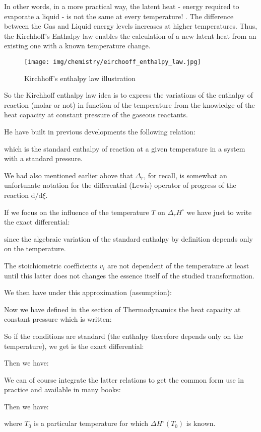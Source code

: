 	In other words, in a more practical way, the latent heat - energy required to evaporate a liquid - is not the same at every temperature! . The difference between the Gas and Liquid energy levels increases at higher temperatures. Thus, the Kirchhoff's Enthalpy law enables the calculation of a new latent heat from an existing one with a known temperature change.
	\begin{figure}[H]
		\centering
		\texttt{[image: img/chemistry/eirchooff\_enthalpy\_law.jpg]}	
		\caption{Kirchhoff's enthalpy law illustration}
	\end{figure}
	So the Kirchhoff enthalpy law idea is to express the variations of the enthalpy of reaction (molar or not) in function of the temperature from the knowledge of the heat capacity at constant pressure of the gaseous reactants.

	He have built in previous developments the following relation:
	
	which is the standard enthalpy of reaction at a given temperature in a system with a standard pressure.

	We had also mentioned earlier above that $\Delta_r$, for recall, is somewhat an unfortunate notation for the differential (Lewis) operator of progress of the reaction $\mathrm{d}/\mathrm{d}\xi$.
	
	If we focus on the influence of the temperature $T$ on $\Delta_r H^\circ$ we have just to write the exact differential:
	
	since the algebraic variation of the standard enthalpy by definition depends only on the temperature.

	The stoichiometric coefficients $v_i$ are not dependent of the temperature at least until this latter does not changes the essence itself of the studied transformation.
	
	We then have under this approximation (assumption):
	
	Now we have defined in the section of Thermodynamics the heat capacity at constant pressure which is written:
	
	So if the conditions are standard (the enthalpy therefore depends only on the temperature), we get is the exact differential:
	
	Then we have:
	
	We can of course integrate the latter relations to get the common form use in practice and available in many books:
	
	Then we have:
	
	where $T_0$ is a particular temperature for which $\Delta H^\circ (T_0)$ is known.

